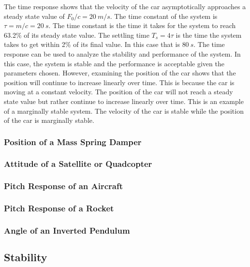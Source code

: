 \noindent The time response shows that the velocity of the car asymptotically approaches a steady state value of $F_0/c = 20~m/s$. The time constant of the system is $\tau = m/c = 20~s$. The time constant is the time it takes for the system to reach 63.2\% of its steady state value. The settling time $T_s=4\tau$ is the time the system takes to get within 2\% of its final value. In this case that is $80~s$. The time response can be used to analyze the stability and performance of the system. In this case, the system is stable and the performance is acceptable given the parameters chosen. However, examining the position of the car shows that the position will continue to increase linearly over time. This is because the car is moving at a constant velocity. The position of the car will not reach a steady state value but rather continue to increase linearly over time. This is an example of a marginally stable system. The velocity of the car is stable while the position of the car is marginally stable.

\subsubsection{Position of a Mass Spring Damper}

\subsubsection{Attitude of a Satellite or Quadcopter}

\subsubsection{Pitch Response of an Aircraft}

\subsubsection{Pitch Response of a Rocket}

\subsubsection{Angle of an Inverted Pendulum}

\subsection{Stability}

